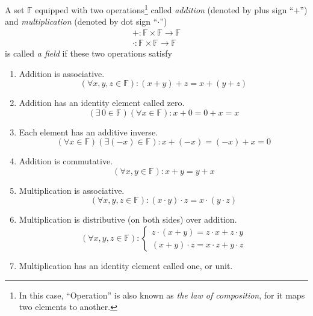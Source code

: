 \begin{definition}[Field]
    A set $\mathbb{F}$ equipped with two operations\footnote{In this case, ``Operation'' is also known as \textit{the law of composition}, for it maps two elements to another.} called \textit{addition} (denoted by plus sign ``$+$'') and \textit{multiplication} (denoted by dot sign ``$\cdot$'')
    \[
        \begin{split}
            +: \mathbb{F}\times\mathbb{F}\to\mathbb{F} \\
            \cdot: \mathbb{F}\times\mathbb{F}\to\mathbb{F}
        \end{split}
    \]
    is called \textit{a field} if these two operations satisfy
    \begin{enumerate}[label = (\arabic*)]
        \item Addition is associative.\label{field:addition-associative}
              \[
                  (\forall x, y, z\in\mathbb{F}): (x + y) + z = x + (y + z)
              \]
        \item Addition has an identity element called zero.\label{field:additive-identity}
              \[
                  (\exists\,0\in\mathbb{F})(\forall x\in\mathbb{F}): x + 0 = 0 + x = x
              \]
        \item Each element has an additive inverse.\label{field:additive-inverse}
              \[
                  (\forall x\in\mathbb{F})(\exists (-x)\in\mathbb{F}): x + (-x) = (-x) + x = 0
              \]
        \item Addition is commutative.\label{field:addition-commutative}
              \[
                  (\forall x,y\in\mathbb{F}): x + y = y + x
              \]
        \item Multiplication is associative.\label{field:multiplication-association}
              \[
                  (\forall x, y, z\in\mathbb{F}): (x\cdot y)\cdot z = x\cdot (y\cdot z)
              \]
        \item Multiplication is distributive (on both sides) over addition.\label{field:distributive}
              \[
                  (\forall x, y, z\in\mathbb{F}):
                  \begin{cases}
                      z\cdot (x + y) = z\cdot x + z\cdot y \\
                      (x + y)\cdot z = x\cdot z + y\cdot z
                  \end{cases}
              \]
        \item Multiplication has an identity element called one, or unit.\label{field:multiplication-identity}

\end{enumerate}
\end{definition}
